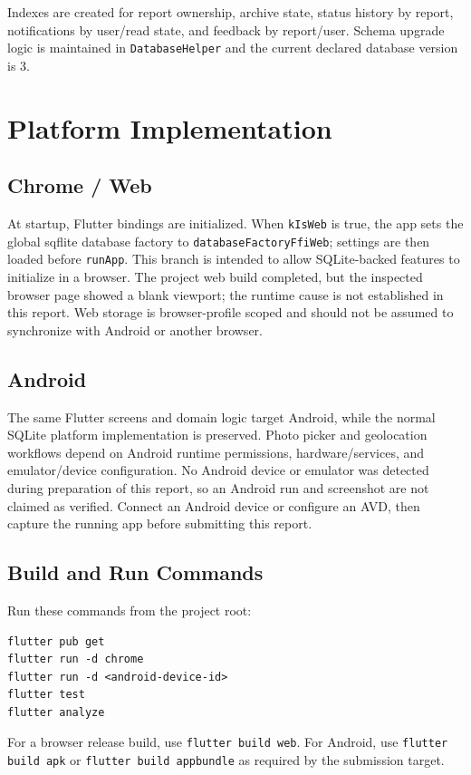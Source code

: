 \documentclass[12pt,a4paper]{report}
\begin{document}
Indexes are created for report ownership, archive state, status history by report, notifications by user/read state, and feedback by report/user. Schema upgrade logic is maintained in \texttt{DatabaseHelper} and the current declared database version is 3.

\chapter{Platform Implementation}
\section{Chrome / Web}
At startup, Flutter bindings are initialized. When \texttt{kIsWeb} is true, the app sets the global sqflite database factory to \texttt{databaseFactoryFfiWeb}; settings are then loaded before \texttt{runApp}. This branch is intended to allow SQLite-backed features to initialize in a browser. The project web build completed, but the inspected browser page showed a blank viewport; the runtime cause is not established in this report. Web storage is browser-profile scoped and should not be assumed to synchronize with Android or another browser.

\section{Android}
The same Flutter screens and domain logic target Android, while the normal SQLite platform implementation is preserved. Photo picker and geolocation workflows depend on Android runtime permissions, hardware/services, and emulator/device configuration. No Android device or emulator was detected during preparation of this report, so an Android run and screenshot are not claimed as verified. Connect an Android device or configure an AVD, then capture the running app before submitting this report.

\section{Build and Run Commands}
Run these commands from the project root:
\begin{lstlisting}
flutter pub get
flutter run -d chrome
flutter run -d <android-device-id>
flutter test
flutter analyze
\end{lstlisting}
For a browser release build, use \texttt{flutter build web}. For Android, use \texttt{flutter build apk} or \texttt{flutter build appbundle} as required by the submission target.
\end{document}

